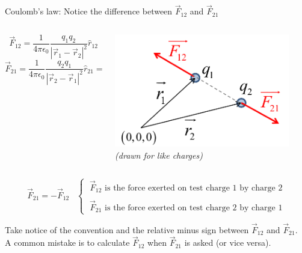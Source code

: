 \begin{frame}{Coulomb's law: Notice the difference between $\vec{F}_{12}$ and $\vec{F}_{21}$}

\begin{columns}
  \begin{column}{0.63\textwidth}
     {
     \begin{equation*}
       \vec{F}_{12} = \frac{1}{4\pi\epsilon_0} \frac{q_1 q_2}{|\vec{r}_{1}-\vec{r}_{2}|^{2}} \hat{r}_{12}
     \end{equation*}
     \begin{equation*}
       \vec{F}_{21} = \frac{1}{4\pi\epsilon_0} \frac{q_2 q_1}{|\vec{r}_{2}-\vec{r}_{1}|^{2}} \hat{r}_{21}
                    = \frac{1}{4\pi\epsilon_0} \frac{q_1 q_2}{|\vec{r}_{1}-\vec{r}_{2}|^{2}} (-\hat{r}_{12})
     \end{equation*}
     }
  \end{column}
  \begin{column}{0.37\textwidth}
   \begin{center}
     \includegraphics[width=0.90\textwidth]{./images/schematics/coulomb_force_2_like_charges.png}\\
     \vspace{0.3cm}
     {\it \small (drawn for like charges)}
   \end{center}
  \end{column}
\end{columns}

\begin{equation*}
 \vec{F}_{21} = - \vec{F}_{12} \;\;\;
 \begin{cases}
    \; \vec{F}_{12} \text{ is the force exerted on test charge 1 by charge 2}\\
    \\
    \; \vec{F}_{21} \text{ is the force exerted on test charge 2 by charge 1}
 \end{cases}
\end{equation*}

\begin{center}
{\small
Take notice of the convention and the relative minus sign between $\vec{F}_{12}$ and $\vec{F}_{21}$.\\
A common mistake is to calculate  $\vec{F}_{12}$ when $\vec{F}_{21}$ is asked (or vice versa).
}
\end{center}

\end{frame}


